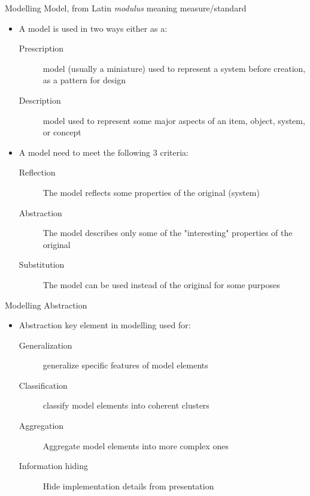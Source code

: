 \documentclass[slidetop,mathserif,red]{beamer}
\begin{document}
\begin{frame}{Modelling}
    Model, from Latin \emph{modulus} meaning measure/standard
    \begin{itemize}
    \item A model is used in two ways either as a:

        \begin{description}
        \item[Prescription] model (usually a miniature) used to represent a system before creation, as a pattern for design

        \item[Description] model used to represent some major aspects of an item, object, system, or concept
        \end{description}

    \item A model need to meet the following 3 criteria:

        \begin{description}
        \item [Reflection ] The model reflects some properties of the original (system)%

        \item [Abstraction] The model describes only some of the "interesting" properties of the original

        \item [Substitution] The model can be used instead of the original for some purposes

        \end{description}
    \end{itemize}

\end{frame}


\begin{frame}{Modelling Abstraction}

    \begin{itemize}
    \item Abstraction key element in modelling used for:

        \begin{description}
        \item[Generalization] generalize specific features of model elements

        \item[Classification] classify model elements into coherent clusters
        
        \item[Aggregation] Aggregate model elements into more complex ones 
        
        \item[Information hiding] Hide implementation details from presentation 
        \end{description}
    \end{itemize}

\end{frame}
\end{document}
